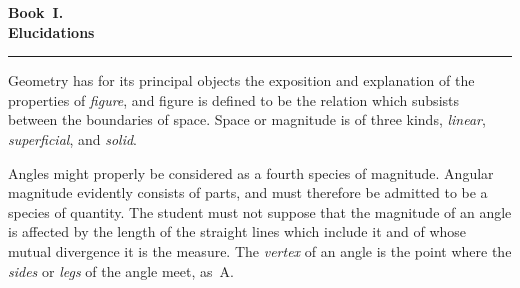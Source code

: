\documentclass[12pt]{article}
\begin{document}
\begin{center}
  {\large\textbf{Book~I.}}\\[4pt]
  {\Large\textbf{Elucidations}}
\end{center}

\vspace{0.4cm}
\noindent\rule{\linewidth}{0.4pt}
\vspace{0.3cm}

\noindent
Geometry has for its principal objects the exposition and explanation of the
properties of \emph{figure}, and figure is defined to be the relation which
subsists between the boundaries of space. Space or magnitude is of three kinds,
\emph{linear}, \emph{superficial}, and \emph{solid}.

\vspace{0.5cm}

\noindent
\begin{minipage}[t]{0.28\linewidth}
  \vspace{0pt}\centering
  \drawCurrentPicture
\end{minipage}\hfill
\begin{minipage}[t]{0.68\linewidth}
  \vspace{0pt}
  Angles might properly be considered as a fourth species of magnitude.
  Angular magnitude evidently consists of parts, and must therefore be
  admitted to be a species of quantity. The student must not suppose that
  the magnitude of an angle is affected by the length of the straight lines
  which include it and of whose mutual divergence it is the measure.
  The \emph{vertex} of an angle is the point where the \emph{sides} or
  \emph{legs} of the angle meet, as~A.
\end{minipage}

\vspace{0.6cm}
\end{document}
